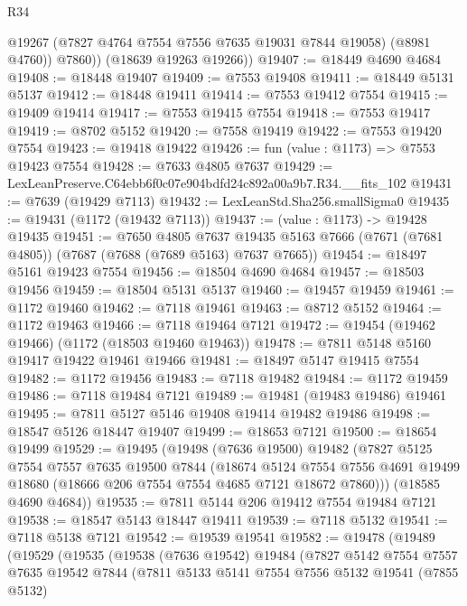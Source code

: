 \begin{lexlean}{R34}
\begin{coremodule}
            @19267
            (@7827 @4764 @7554 @7556 @7635 @19031 @7844 @19058)
            (@8981 @4760))
          @7860))
      (@18639 @19263 @19266))
@19407 := @18449 @4690 @4684
@19408 := @18448 @19407
@19409 := @7553 @19408
@19411 := @18449 @5131 @5137
@19412 := @18448 @19411
@19414 := @7553 @19412 @7554
@19415 := @19409 @19414
@19417 := @7553 @19415 @7554
@19418 := @7553 @19417
@19419 := @8702 @5152
@19420 := @7558 @19419
@19422 := @7553 @19420 @7554
@19423 := @19418 @19422
@19426 := fun (value : @1173) => @7553 @19423 @7554
@19428 := @7633 @4805 @7637
@19429 := LexLeanPreserve.C64ebb6f0c07e904bdfd24c892a00a9b7.R34.__fits_102
@19431 := @7639 (@19429 @7113)
@19432 := LexLeanStd.Sha256.smallSigma0
@19435 := @19431 (@1172 (@19432 @7113))
@19437 := (value : @1173) -> @19428 @19435
@19451 := @7650
    @4805
    @7637
    @19435
    @5163
    @7666
    (@7671 (@7681 @4805))
    (@7687 (@7688 (@7689 @5163) @7637 @7665))
@19454 := @18497 @5161 @19423 @7554
@19456 := @18504 @4690 @4684
@19457 := @18503 @19456
@19459 := @18504 @5131 @5137
@19460 := @19457 @19459
@19461 := @1172 @19460
@19462 := @7118 @19461
@19463 := @8712 @5152
@19464 := @1172 @19463
@19466 := @7118 @19464 @7121
@19472 := @19454 (@19462 @19466) (@1172 (@18503 @19460 @19463))
@19478 := @7811 @5148 @5160 @19417 @19422 @19461 @19466
@19481 := @18497 @5147 @19415 @7554
@19482 := @1172 @19456
@19483 := @7118 @19482
@19484 := @1172 @19459
@19486 := @7118 @19484 @7121
@19489 := @19481 (@19483 @19486) @19461
@19495 := @7811 @5127 @5146 @19408 @19414 @19482 @19486
@19498 := @18547 @5126 @18447 @19407
@19499 := @18653 @7121
@19500 := @18654 @19499
@19529 := @19495
    (@19498
      (@7636 @19500)
      @19482
      (@7827
        @5125
        @7554
        @7557
        @7635
        @19500
        @7844
        (@18674
          @5124
          @7554
          @7556
          @4691
          @19499
          @18680
          (@18666 @206 @7554 @7554 @4685 @7121 @18672 @7860)))
      (@18585 @4690 @4684))
@19535 := @7811 @5144 @206 @19412 @7554 @19484 @7121
@19538 := @18547 @5143 @18447 @19411
@19539 := @7118 @5132
@19541 := @7118 @5138 @7121
@19542 := @19539 @19541
@19582 := @19478
    (@19489
      (@19529
        (@19535
          (@19538
            (@7636 @19542)
            @19484
            (@7827
              @5142
              @7554
              @7557
              @7635
              @19542
              @7844
              (@7811
                @5133
                @5141
                @7554
                @7556
                @5132
                @19541
                (@7855 @5132)

\end{coremodule}
\end{lexlean}
